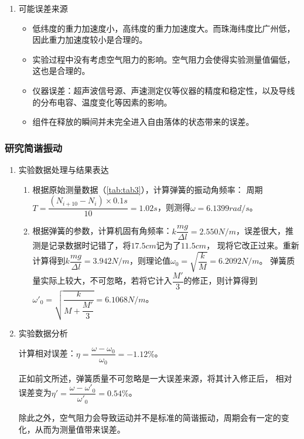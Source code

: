 \documentclass[dvipsnames, svgnames,a4paper,11pt]{article}
\begin{document}
\begin{enumerate}
		\item 可能误差来源
		\begin{itemize}
			\item 低纬度的重力加速度小，高纬度的重力加速度大。而珠海纬度比广州低，因此重力加速度较小是合理的。
			\item 实验过程中没有考虑空气阻力的影响。空气阻力会使得实验测量值偏低，这也是合理的。
			\item 仪器误差：超声波信号源、声速测定仪等仪器的精度和稳定性，以及导线的分布电容、温度变化等因素的影响。
			\item 组件在释放的瞬间并未完全进入自由落体的状态带来的误差。
		\end{itemize}		
		
	\end{enumerate}
	
	\subsubsection{研究简谐振动}
	\begin{enumerate}
		\item 实验数据处理与结果表达
		\begin{enumerate}
			\item 根据原始测量数据（\cref{tab:tab3}），计算弹簧的振动角频率：
			周期$T=\dfrac{(N_{i+10}-N_i)\times0.1s}{10}=1.02s$，则测得$\omega=6.1399rad/s$。
			\item 根据弹簧的参数，计算机固有角频率：$k\dfrac{mg}{\Delta l}=2.550N/m$，误差很大，推测是记录数据时记错了，将$17.5cm$记为了$11.5cm$，
			现将它改正过来。重新计算得到$k\dfrac{mg}{\Delta l}=3.942N/m$，则理论值$\omega_0=\sqrt{\dfrac{k}{M}}=6.2092N/m$。
			弹簧质量实际上较大，不可忽略，若将它计入$\dfrac{M'}{3}$的修正，则计算得到$\omega'_0=\sqrt{\dfrac{k}{M+\dfrac{M'}{3}}}=6.1068N/m$。						
		\end{enumerate}
		
		\item 实验数据分析
		
		计算相对误差：$\eta=\dfrac{\omega-\omega_0}{\omega_0}=-1.12\%$。
		
		正如前文所述，弹簧质量不可忽略是一大误差来源，将其计入修正后，
		相对误差变为$\eta'=\dfrac{\omega-\omega'_0}{\omega'_0}=0.54\%$。
		
		除此之外，空气阻力会导致运动并不是标准的简谐振动，周期会有一定的变化，从而为测量值带来误差。
		
	\end{enumerate}
	
\end{document}
